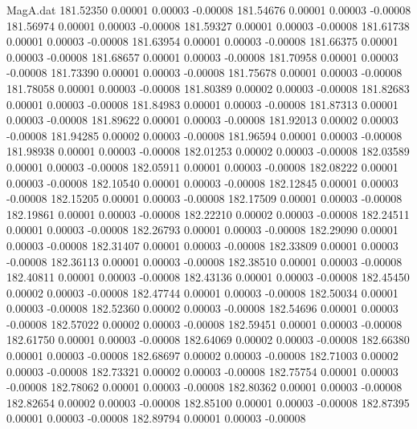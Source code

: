 \begin{filecontents}{MagA.dat}
 181.52350    0.00001    0.00003   -0.00008
 181.54676    0.00001    0.00003   -0.00008
 181.56974    0.00001    0.00003   -0.00008
 181.59327    0.00001    0.00003   -0.00008
 181.61738    0.00001    0.00003   -0.00008
 181.63954    0.00001    0.00003   -0.00008
 181.66375    0.00001    0.00003   -0.00008
 181.68657    0.00001    0.00003   -0.00008
 181.70958    0.00001    0.00003   -0.00008
 181.73390    0.00001    0.00003   -0.00008
 181.75678    0.00001    0.00003   -0.00008
 181.78058    0.00001    0.00003   -0.00008
 181.80389    0.00002    0.00003   -0.00008
 181.82683    0.00001    0.00003   -0.00008
 181.84983    0.00001    0.00003   -0.00008
 181.87313    0.00001    0.00003   -0.00008
 181.89622    0.00001    0.00003   -0.00008
 181.92013    0.00002    0.00003   -0.00008
 181.94285    0.00002    0.00003   -0.00008
 181.96594    0.00001    0.00003   -0.00008
 181.98938    0.00001    0.00003   -0.00008
 182.01253    0.00002    0.00003   -0.00008
 182.03589    0.00001    0.00003   -0.00008
 182.05911    0.00001    0.00003   -0.00008
 182.08222    0.00001    0.00003   -0.00008
 182.10540    0.00001    0.00003   -0.00008
 182.12845    0.00001    0.00003   -0.00008
 182.15205    0.00001    0.00003   -0.00008
 182.17509    0.00001    0.00003   -0.00008
 182.19861    0.00001    0.00003   -0.00008
 182.22210    0.00002    0.00003   -0.00008
 182.24511    0.00001    0.00003   -0.00008
 182.26793    0.00001    0.00003   -0.00008
 182.29090    0.00001    0.00003   -0.00008
 182.31407    0.00001    0.00003   -0.00008
 182.33809    0.00001    0.00003   -0.00008
 182.36113    0.00001    0.00003   -0.00008
 182.38510    0.00001    0.00003   -0.00008
 182.40811    0.00001    0.00003   -0.00008
 182.43136    0.00001    0.00003   -0.00008
 182.45450    0.00002    0.00003   -0.00008
 182.47744    0.00001    0.00003   -0.00008
 182.50034    0.00001    0.00003   -0.00008
 182.52360    0.00002    0.00003   -0.00008
 182.54696    0.00001    0.00003   -0.00008
 182.57022    0.00002    0.00003   -0.00008
 182.59451    0.00001    0.00003   -0.00008
 182.61750    0.00001    0.00003   -0.00008
 182.64069    0.00002    0.00003   -0.00008
 182.66380    0.00001    0.00003   -0.00008
 182.68697    0.00002    0.00003   -0.00008
 182.71003    0.00002    0.00003   -0.00008
 182.73321    0.00002    0.00003   -0.00008
 182.75754    0.00001    0.00003   -0.00008
 182.78062    0.00001    0.00003   -0.00008
 182.80362    0.00001    0.00003   -0.00008
 182.82654    0.00002    0.00003   -0.00008
 182.85100    0.00001    0.00003   -0.00008
 182.87395    0.00001    0.00003   -0.00008
 182.89794    0.00001    0.00003   -0.00008

\end{filecontents}
